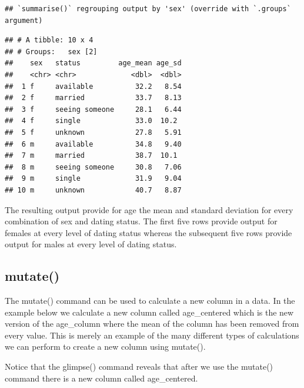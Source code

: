 \documentclass[
]{krantz}
\makeatletter
\newenvironment{Shaded}{\begin{snugshade}}{\end{snugshade}}
\newcommand{\DataTypeTok}[1]{\textcolor[rgb]{0.27,0.27,0.27}{#1}}
\newcommand{\KeywordTok}[1]{\textcolor[rgb]{0.27,0.27,0.27}{\textbf{#1}}}
\newcommand{\NormalTok}[1]{#1}
\newcommand{\OperatorTok}[1]{\textcolor[rgb]{0.43,0.43,0.43}{\textbf{#1}}}
\newcommand{\OtherTok}[1]{\textcolor[rgb]{0.37,0.37,0.37}{#1}}
\newcommand{\StringTok}[1]{\textcolor[rgb]{0.5,0.5,0.5}{#1}}
\newenvironment{kframe}{%
\medskip{}
\setlength{\fboxsep}{.8em}
 \def\at@end@of@kframe{}%
 \ifinner\ifhmode%
  \def\at@end@of@kframe{\end{minipage}}%
  \begin{minipage}{\columnwidth}%
 \fi\fi%
 \def\FrameCommand##1{\hskip\@totalleftmargin \hskip-\fboxsep
 \colorbox{shadecolor}{##1}\hskip-\fboxsep
     \hskip-\linewidth \hskip-\@totalleftmargin \hskip\columnwidth}%
 \MakeFramed {\advance\hsize-\width
   \@totalleftmargin\z@ \linewidth\hsize
   \@setminipage}}%
 {\par\unskip\endMakeFramed%
 \at@end@of@kframe}
\renewenvironment{Shaded}{\begin{kframe}}{\end{kframe}}
\makeatother
\begin{document}
\begin{verbatim}
## `summarise()` regrouping output by 'sex' (override with `.groups` argument)
\end{verbatim}

\begin{verbatim}
## # A tibble: 10 x 4
## # Groups:   sex [2]
##    sex   status         age_mean age_sd
##    <chr> <chr>             <dbl>  <dbl>
##  1 f     available          32.2   8.54
##  2 f     married            33.7   8.13
##  3 f     seeing someone     28.1   6.44
##  4 f     single             33.0  10.2 
##  5 f     unknown            27.8   5.91
##  6 m     available          34.8   9.40
##  7 m     married            38.7  10.1 
##  8 m     seeing someone     30.8   7.06
##  9 m     single             31.9   9.04
## 10 m     unknown            40.7   8.87
\end{verbatim}

The resulting output provide for age the mean and standard deviation for every combination of sex and dating status. The first five rows provide output for females at every level of dating status whereas the subsequent five rows provide output for males at every level of dating status.

\hypertarget{mutate}{%
\subsection{mutate()}\label{mutate}}

The mutate() command can be used to calculate a new column in a data. In the example below we calculate a new column called age\_centered which is the new version of the age\_column where the mean of the column has been removed from every value. This is merely an example of the many different types of calculations we can perform to create a new column using mutate().

\begin{Shaded}
\end{Shaded}

Notice that the glimpse() command reveals that after we use the mutate() command there is a new column called age\_centered.
\end{document}
